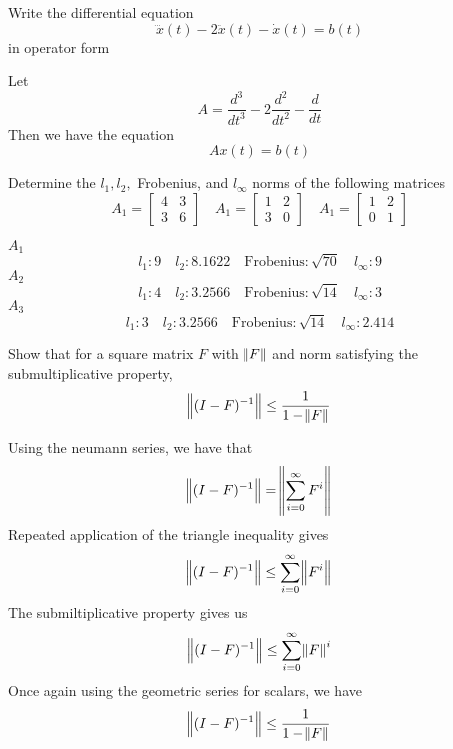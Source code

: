 \documentclass{homework}
\begin{document}
\begin{problem}[4-1]
  Write the differential equation
  \[\dddot{x}(t) - 2\ddot{x}(t) - \dot{x}(t) = b(t)\]
  in operator form
\end{problem}

\begin{solution}
  Let 
  \[ A = \frac{d^3}{dt^3} - 2 \frac{d^2}{dt^2} - \frac{d}{dt} \]
  Then we have the equation
  \[ Ax(t) = b(t)\]
\end{solution}

\begin{problem}[4-4]
  Determine the $l_1,l_2,$ Frobenius, and $l_{\infty}$ norms of the following matrices
  \[ A_1 =
    \begin{bmatrix}
      4 & 3 \\
      3 & 6
    \end{bmatrix}
    \quad 
    A_1 =
    \begin{bmatrix}
      1 & 2 \\
      3 & 0
    \end{bmatrix}
    \quad
    A_1 =
    \begin{bmatrix}
      1 & 2 \\
      0 & 1
    \end{bmatrix}
  \]
\end{problem}

\begin{solution}
  $A_1$
  \[ l_1: 9 \quad l_2: 8.1622 \quad \text{Frobenius}: \sqrt{70} \quad l_\infty: 9\]
  $A_2$
  \[ l_1: 4 \quad l_2: 3.2566 \quad \text{Frobenius}: \sqrt{14} \quad l_\infty: 3\]
  $A_3$
  \[ l_1: 3 \quad l_2: 3.2566 \quad \text{Frobenius}: \sqrt{14} \quad l_\infty: 2.414\]
\end{solution}

\begin{problem}[4-10]
  Show that for a square matrix $F$ with $\norm{F}$ and norm satisfying the submultiplicative property,
 \[ \norm{(I - F)^{-1}} \leq \frac{1}{1 - \norm{F}} \]
\end{problem}

\begin{solution}
  Using the neumann series, we have that 
  \[ \norm{(I-F)^{-1}} = \norm{ \sum^{\infty}_{i=0} F^i} \]
  Repeated application of the triangle inequality gives
  \[ \norm{(I-F)^{-1}} \leq \sum^{\infty}_{i=0} \norm{F^i} \]
  The submiltiplicative property gives us
  \[ \norm{(I-F)^{-1}} \leq \sum^{\infty}_{i=0} \norm{F}^i \]
  Once again using the geometric series for scalars, we have
  \[ \norm{(I-F)^{-1}} \leq \frac{1}{1 - \norm{F}} \]
\end{solution}
\end{document}

